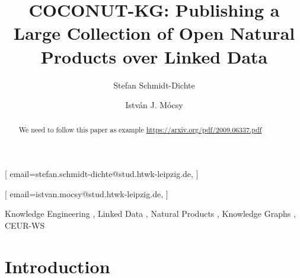\documentclass[
]{ceurart}
\begin{document}


\title{COCONUT-KG: Publishing a Large Collection of Open Natural Products over Linked Data}


\author[1]{Stefan Schmidt-Dichte}[%
email=stefan.schmidt-dichte@stud.htwk-leipzig.de,
]
\cormark[1]
\address[1]{AKSW, Leipzig University of Applied Sciences (HTWK),
  Gustav-Freytag-Straße 42a, Leipzig, 04277, Germany}

\author[1]{István J. Mócsy}[%
email=istvan.mocsy@stud.htwk-leipzig.de,
]





\begin{abstract}
We need to follow this paper as example \url{https://arxiv.org/pdf/2009.06337.pdf}
\end{abstract}

\begin{keywords}
  Knowledge Engineering \sep
  Linked Data \sep
  Natural Products \sep
  Knowledge Graphs \sep
  CEUR-WS
\end{keywords}

\maketitle

\section{Introduction}
\end{document}
